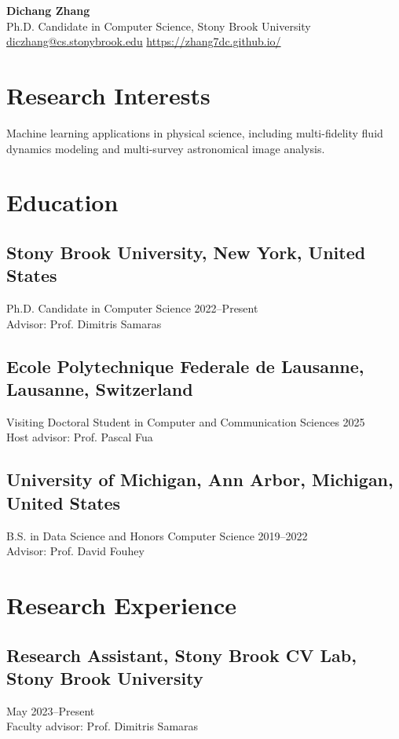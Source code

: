 \documentclass[11pt,letterpaper]{article}
\begin{document}
\begin{center}
{\LARGE \textbf{Dichang Zhang}}\\
Ph.D. Candidate in Computer Science, Stony Brook University\\
\href{mailto:diczhang@cs.stonybrook.edu}{diczhang@cs.stonybrook.edu} \quad
\href{https://zhang7dc.github.io/}{https://zhang7dc.github.io/} 
\end{center}

\section{Research Interests}

Machine learning applications in physical science, including multi-fidelity fluid dynamics modeling and multi-survey astronomical image analysis. 

\section{Education}

\subsection{Stony Brook University, New York, United States}
Ph.D. Candidate in Computer Science \hfill 2022--Present\\
Advisor: Prof. Dimitris Samaras

\subsection{Ecole Polytechnique Federale de Lausanne, Lausanne, Switzerland}
Visiting Doctoral Student in Computer and Communication Sciences \hfill 2025\\
Host advisor: Prof. Pascal Fua

\subsection{University of Michigan, Ann Arbor, Michigan, United States}
B.S. in Data Science and Honors Computer Science \hfill 2019--2022\\
Advisor: Prof. David Fouhey

\section{Research Experience}

\subsection{Research Assistant, Stony Brook CV Lab, Stony Brook University}
May 2023--Present\\
Faculty advisor: Prof. Dimitris Samaras
\end{document}
